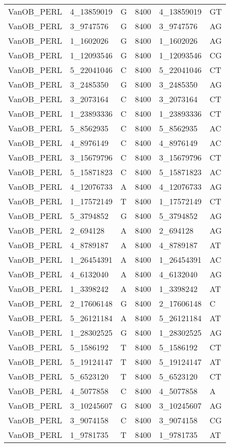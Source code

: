 \begin{center}
\begin{longtable}{|l|l|l|l|l|l|}
VanOB\_PERL&4\_13859019&G&8400&4\_13859019&GT\\
VanOB\_PERL&3\_9747576&G&8400&3\_9747576&AG\\
VanOB\_PERL&1\_1602026&G&8400&1\_1602026&AG\\
VanOB\_PERL&1\_12093546&G&8400&1\_12093546&CG\\
VanOB\_PERL&5\_22041046&C&8400&5\_22041046&CT\\
VanOB\_PERL&3\_2485350&G&8400&3\_2485350&AG\\
VanOB\_PERL&3\_2073164&C&8400&3\_2073164&CT\\
VanOB\_PERL&1\_23893336&C&8400&1\_23893336&CT\\
VanOB\_PERL&5\_8562935&C&8400&5\_8562935&AC\\
VanOB\_PERL&4\_8976149&C&8400&4\_8976149&AC\\
VanOB\_PERL&3\_15679796&C&8400&3\_15679796&CT\\
VanOB\_PERL&5\_15871823&C&8400&5\_15871823&AC\\
VanOB\_PERL&4\_12076733&A&8400&4\_12076733&AG\\
VanOB\_PERL&1\_17572149&T&8400&1\_17572149&CT\\
VanOB\_PERL&5\_3794852&G&8400&5\_3794852&AG\\
VanOB\_PERL&2\_694128&A&8400&2\_694128&AG\\
VanOB\_PERL&4\_8789187&A&8400&4\_8789187&AT\\
VanOB\_PERL&1\_26454391&A&8400&1\_26454391&AC\\
VanOB\_PERL&4\_6132040&A&8400&4\_6132040&AG\\
VanOB\_PERL&1\_3398242&A&8400&1\_3398242&AT\\
VanOB\_PERL&2\_17606148&G&8400&2\_17606148&C\\
VanOB\_PERL&5\_26121184&A&8400&5\_26121184&AT\\
VanOB\_PERL&1\_28302525&G&8400&1\_28302525&AG\\
VanOB\_PERL&5\_1586192&T&8400&5\_1586192&CT\\
VanOB\_PERL&5\_19124147&T&8400&5\_19124147&AT\\
VanOB\_PERL&5\_6523120&T&8400&5\_6523120&CT\\
VanOB\_PERL&4\_5077858&C&8400&4\_5077858&A\\
VanOB\_PERL&3\_10245607&G&8400&3\_10245607&AG\\
VanOB\_PERL&3\_9074158&C&8400&3\_9074158&CG\\
VanOB\_PERL&1\_9781735&T&8400&1\_9781735&AT\\

\end{longtable}
\end{center}

